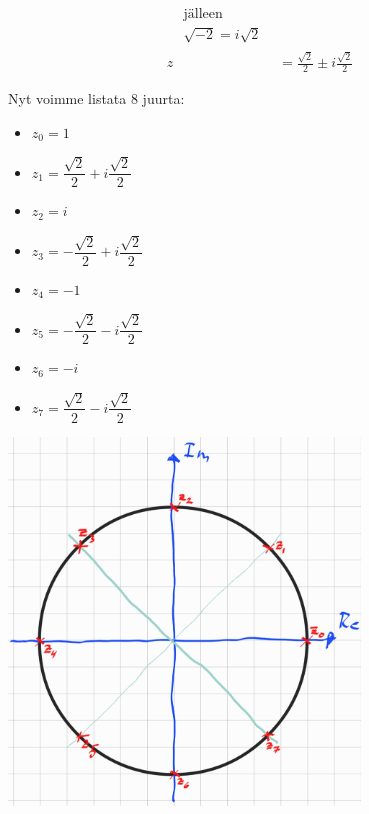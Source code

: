 \documentclass{article}
\begin{document}
\begin{itemize}
\begin{itemize}
\[\begin{aligned}
\begin{aligned}
                    &\text{jälleen} \\
                    &\sqrt{-2} = i\sqrt{2}
                \end{aligned} \\
            z &= \frac{\sqrt{2}}{2} \pm i\frac{\sqrt{2}}{2}
        \end{aligned}
    \]
    \end{itemize}
\fi
    Nyt voimme listata 8 juurta:
    \begin{itemize}
        \item [] \( z_0 = 1 \)
        \item [] \( z_1 = \dfrac{\sqrt{2}}{2} + i\dfrac{\sqrt{2}}{2} \)
        \item [] \( z_2 = i \)
        \item [] \( z_3 = -\dfrac{\sqrt{2}}{2} + i\dfrac{\sqrt{2}}{2} \)
        \item [] \( z_4 = -1 \)
        \item [] \( z_5 = -\dfrac{\sqrt{2}}{2} - i\dfrac{\sqrt{2}}{2} \)
        \item [] \( z_6 = -i \)
        \item [] \( z_7 = \dfrac{\sqrt{2}}{2} - i\dfrac{\sqrt{2}}{2} \)
    \end{itemize}
    \begin{center}
        \includegraphics[width=0.7\textwidth]{harj6teht5a.jpg}
    \end{center}

    \newpage    
        

\end{itemize}
\end{document}
